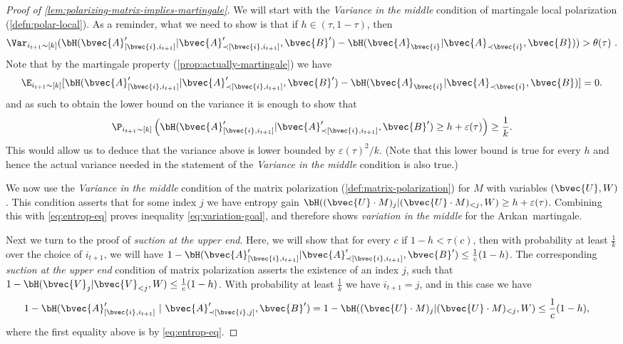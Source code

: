 \documentclass[11pt]{article}
\newcommand{\Arikan}{Ar\i kan}
\begin{document}
\begin{proof}[Proof of \cref{lem:polarizing-matrix-implies-martingale}]
	We will start with the \emph{Variance in the middle} condition of martingale local polarization (\cref{defn:polar-local}).  As a reminder, what we need to show is that if $h \in (\tau, 1-\tau)$, then 
	\[ \Var_{i_{t+1} \sim [k]} (\bH(\bvec{A}'_{[\bvec{i}, i_{t+1}]} | \bvec{A}'_{\prec [\bvec{i}, i_{t+1}]}, \bvec{B}') - \bH(\bvec{A}_{\bvec{i}} | \bvec{A}_{\prec \bvec{i}}, \bvec{B})) > \theta(\tau) \ . \]
	Note that by the martingale property (\cref{prop:actually-martingale}) we have $$\E_{i_{t+1}\sim [k]} [\bH(\bvec{A}'_{[\bvec{i}, i_{t+1}]} | \bvec{A}'_{\prec [\bvec{i}, i_{t+1}]}, \bvec{B}') - \bH(\bvec{A}_{\bvec{i}} | \bvec{A}_{\prec \bvec{i}}, \bvec{B})]=0.$$
	and as such to obtain the lower bound on the variance it is enough to show that
	\begin{equation}
		\P_{i_{t+1} \sim [k]}\left(\bH(\bvec{A}'_{[\bvec{i}, i_{t+1}]} | \bvec{A}'_{\prec [\bvec{i}, i_{t+1}]}, \bvec{B}') \geq h + \varepsilon(\tau)\right) \geq \frac{1}{k}.
		\label{eq:variation-goal}
	\end{equation}
	This would allow us to deduce that the variance above is lower bounded by $\varepsilon(\tau)^2/k$. (Note that this lower bound is true for every $h$ and hence the actual variance needed in the statement of the \emph{Variance in the middle} condition is also true.)
	
	We now use the \emph{Variance in the middle} condition of the matrix polarization (\cref{def:matrix-polarization}) for $M$ with variables $(\bvec{U}, W)$ . This condition asserts that for some index $j$ we have entropy gain $\bH( (\bvec{U} \cdot M)_j | (\bvec{U} \cdot M)_{<j}, W) \geq h + \varepsilon(\tau)$. 
	Combining this with \cref{eq:entrop-eq} proves inequality \cref{eq:variation-goal}, and therefore shows \emph{variation in the middle}  for the \Arikan\ martingale.
	
	Next we turn to the proof of \emph{suction at the upper end}. Here, we will show that for every $c$ if $1 - h < \tau(c)$, then with probability at least $\frac{1}{k}$ over the choice of $i_{t+1}$,  we will have $1 - \bH(\bvec{A}'_{[\bvec{i}, i_{t+1}]} | \bvec{A}'_{\prec [\bvec{i}, i_{t+1}]}, \bvec{B}') \le \frac{1}{c}(1 - h)$.
	The corresponding \emph{suction at the upper end} condition of matrix polarization asserts the existence of an index $j$, such that $1 - \bH( \bvec{V}_j | \bvec{V}_{<j}, W) \le \frac{1}{c}(1-h)$. With probability at least $\frac{1}{k}$ we have $i_{t+1} = j$, and in this case we have
	\begin{align*}
		1 - \bH(\bvec{A}'_{[\bvec{i}, i_{t+1}]} ~|~ \bvec{A}'_{\prec [\bvec{i}, j]}, \bvec{B}') &  = 1 - \bH( (\bvec{U} \cdot M)_{j} | (\bvec{U} \cdot M)_{<j}, W ) 
		\leq \frac{1}{c} (1 - h),
	\end{align*}
	where the first equality above is by \cref{eq:entrop-eq}.
	

\end{proof}
\end{document}
